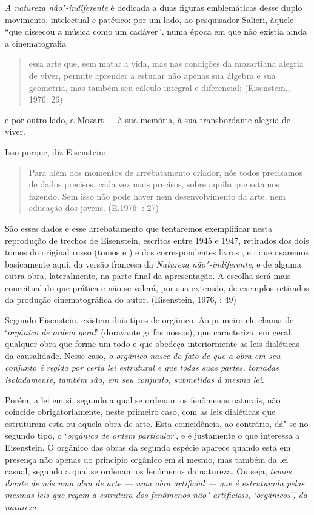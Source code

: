 \emph{A natureza não"-indiferente} é dedicada a duas figuras emblemáticas
desse duplo movimento, intelectual e patético: por um lado, ao
pesquisador Salieri, àquele ``que dissecou a música como um cadáver'',
numa época em que não existia ainda a cinematografia

\begin{quote}
essa arte que, sem matar a vida, mas nas condições da mozartiana alegria
de viver, permite aprender a estudar não apenas sua álgebra e sua
geometria, mas também seu cálculo integral e diferencial; (Eisenstein,,
1976: 26)
\end{quote}

e por outro lado, a Mozart --- à sua memória, à sua transbordante alegria
de viver.

Isso porque, diz Eisenstein:

\begin{quote}
Para além dos momentos de arrebatamento criador, nós todos precisamos de
dados precisos, cada vez mais precisos, sobre aquilo que estamos
fazendo. Sem isso não pode haver nem desenvolvimento da arte, nem
educação dos jovens. (E.1976: : 27)
\end{quote}

São esses dados e esse arrebatamento que tentaremos exemplificar nesta
reprodução de trechos de Eisenstein, escritos entre 1945 e 1947,
retirados dos dois tomos do original russo (tomos  e ) e dos
correspondentes livros , e , que usaremos basicamente aqui, da versão
francesa da \emph{Natureza não"-indiferente}, e de alguma outra obra,
lateralmente, na parte final da apresentação. A escolha será mais
conceitual do que prática e não se valerá, por sua extensão, de exemplos
retirados da produção cinematográfica do autor. (Eisenstein, 1976, :
49)

Segundo Eisenstein, existem dois tipos de orgânico. Ao primeiro ele
chama de `\emph{orgânico de ordem geral}' (doravante grifos nossos), que caracteriza, em geral,
qualquer obra que forme um todo e que obedeça interiormente as leis
dialéticas da causalidade. Nesse caso, \emph{o orgânico nasce do fato
de que a obra em seu conjunto é regida por certa lei estrutural e que
todas suas partes, tomadas isoladamente, também são, em seu conjunto,
submetidas à mesma lei}.

Porém, a lei em si, segundo a qual se ordenam os fenômenos naturais, não
coincide obrigatoriamente, neste primeiro caso, com as leis dialéticas
que estruturam esta ou aquela obra de arte. Esta coincidência, ao
contrário, dá"-se no segundo tipo, o `\emph{orgânico de ordem
particular}', e é justamente o que interessa a Eisenstein. O orgânico
das obras da segunda espécie aparece quando está em presença não apenas
do princípio orgânico em si mesmo, mas também da lei casual, segundo a
qual se ordenam os fenômenos da natureza. Ou seja, \emph{temos diante
de nós uma obra de arte --- uma obra artificial --- que é estruturada
pelas mesmas leis que regem a estrutura dos fenômenos não"-artificiais,
`orgânicos', da natureza.}

